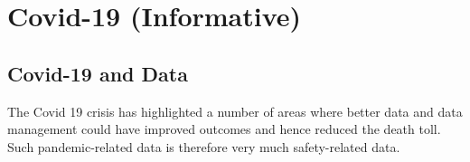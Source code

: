 %
%
\section{Covid-19 (Informative)} \label{bkm:Covid19}



\subsection{Covid-19 and Data}
The Covid 19 crisis has highlighted a number of areas where better data and data management could have improved outcomes and hence reduced the death toll. Such pandemic-related data is therefore very much safety-related data. 

